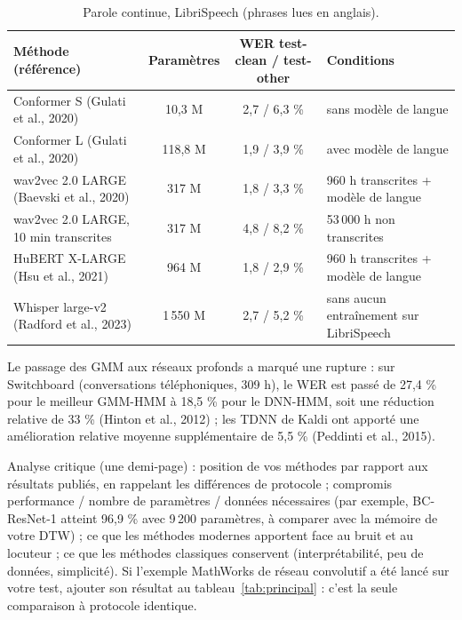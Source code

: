 \documentclass[11pt,a4paper]{article}
\begin{document}
\begin{table}[H]\centering\small
\begin{tabularx}{\linewidth}{>{\raggedright\arraybackslash}p{5cm}ccL}
\toprule
Méthode (référence) & Paramètres & WER test-clean / test-other & Conditions \\
\midrule
Conformer S (Gulati et al., 2020) & 10,3 M & 2,7 / 6,3 \% & sans modèle de langue \\
Conformer L (Gulati et al., 2020) & 118,8 M & 1,9 / 3,9 \% & avec modèle de langue \\
wav2vec 2.0 LARGE (Baevski et al., 2020) & 317 M & 1,8 / 3,3 \% & 960 h transcrites + modèle de langue \\
wav2vec 2.0 LARGE, 10 min transcrites & 317 M & 4,8 / 8,2 \% & 53\,000 h non transcrites \\
HuBERT X-LARGE (Hsu et al., 2021) & 964 M & 1,8 / 2,9 \% & 960 h transcrites + modèle de langue \\
Whisper large-v2 (Radford et al., 2023) & 1\,550 M & 2,7 / 5,2 \% & sans aucun entraînement sur LibriSpeech \\
\bottomrule
\end{tabularx}
\caption{Parole continue, LibriSpeech (phrases lues en anglais).}\label{tab:libri}
\end{table}

Le passage des GMM aux réseaux profonds a marqué une rupture : sur Switchboard (conversations téléphoniques, 309 h), le WER est passé de 27,4 \% pour le meilleur GMM-HMM à 18,5 \% pour le DNN-HMM, soit une réduction relative de 33 \% (Hinton et al., 2012) ; les TDNN de Kaldi ont apporté une amélioration relative moyenne supplémentaire de 5,5 \% (Peddinti et al., 2015).

\begin{aremplir}
Analyse critique (une demi-page) : position de vos méthodes par rapport aux résultats publiés, en rappelant les différences de protocole ; compromis performance / nombre de paramètres / données nécessaires (par exemple, BC-ResNet-1 atteint 96,9 \% avec 9\,200 paramètres, à comparer avec la mémoire de votre DTW) ; ce que les méthodes modernes apportent face au bruit et au locuteur ; ce que les méthodes classiques conservent (interprétabilité, peu de données, simplicité). Si l'exemple MathWorks de réseau convolutif a été lancé sur votre test, ajouter son résultat au tableau~\ref{tab:principal} : c'est la seule comparaison à protocole identique.
\end{aremplir}

\end{document}
